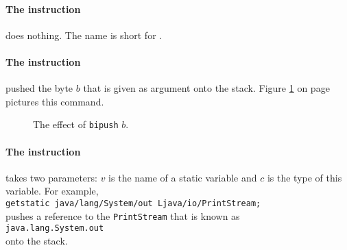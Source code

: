 \paragraph{The instruction }
does nothing.  The name is short for .


\paragraph{The instruction }
pushed the byte $b$ that is given as argument onto the stack.
Figure \ref{fig:ijvm-bipush} on page \pageref{fig:ijvm-bipush} pictures this command.


\setlength{\unitlength}{0.5cm}
\begin{figure}[!ht]
  \centering
{}
  \caption{The effect of \texttt{bipush} $b$.}
  \label{fig:ijvm-bipush}
\end{figure}
 



\paragraph{The instruction }
takes two parameters:  $v$ is the name of a static variable and $c$ is the type of this variable.
For example,  
\\[0.2cm]
\hspace*{1.3cm}
\texttt{getstatic java/lang/System/out Ljava/io/PrintStream;}
\\[0.2cm] 
pushes a reference to the \texttt{PrintStream} that is known as 
\\[0.2cm]
\hspace*{1.3cm}
\texttt{java.lang.System.out}
\\[0.2cm]
onto the stack.


